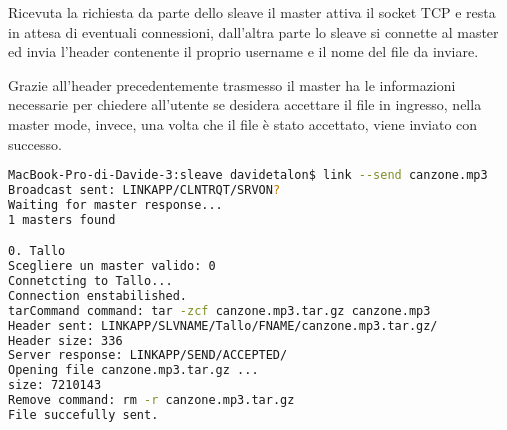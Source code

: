 \documentclass[11pt,fleqn]{book} %
\begin{document}
Ricevuta la richiesta da parte dello sleave il master attiva il socket TCP e resta in attesa di eventuali connessioni, dall'altra parte lo sleave si connette al master ed invia l'header contenente il proprio username e il nome del file da inviare.

\begin{Parallel}{0.5\textwidth}{0.5\textwidth}
\ParallelPar
\end{Parallel}

Grazie all'header precedentemente trasmesso il master ha le informazioni necessarie per chiedere all'utente se desidera accettare il file in ingresso, nella master mode, invece, una volta che il file è stato accettato, viene inviato con successo.

\begin{lstlisting}[language=Bash]
MacBook-Pro-di-Davide-3:sleave davidetalon$ link --send canzone.mp3
Broadcast sent: LINKAPP/CLNTRQT/SRVON?
Waiting for master response...
1 masters found

0. Tallo
Scegliere un master valido: 0
Connetcting to Tallo...
Connection enstabilished.
tarCommand command: tar -zcf canzone.mp3.tar.gz canzone.mp3
Header sent: LINKAPP/SLVNAME/Tallo/FNAME/canzone.mp3.tar.gz/
Header size: 336
Server response: LINKAPP/SEND/ACCEPTED/
Opening file canzone.mp3.tar.gz ...
size: 7210143
Remove command: rm -r canzone.mp3.tar.gz
File succefully sent.
\end{lstlisting}
\end{document}
